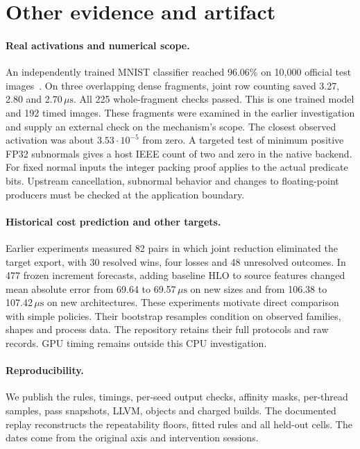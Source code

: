 \documentclass[sigplan,10pt,review,anonymous,nonacm]{acmart}
\newcommand{\us}{\ensuremath{\,\mu\mathrm{s}}}
\begin{document}
\appendix
\section{Other evidence and artifact}
\paragraph{Real activations and numerical scope.}
An independently trained MNIST classifier reached 96.06\% on 10,000 official test images~\cite{mnistkeras}. On three overlapping dense fragments, joint row counting saved 3.27, 2.80 and 2.70\us{}. All 225 whole-fragment checks passed. This is one trained model and 192 timed images. These fragments were examined in the earlier investigation and supply an external check on the mechanism's scope. The closest observed activation was about $3.53\cdot10^{-5}$ from zero. A targeted test of minimum positive FP32 subnormals gives a host IEEE count of two and zero in the native backend. For fixed normal inputs the integer packing proof applies to the actual predicate bits. Upstream cancellation, subnormal behavior and changes to floating-point producers must be checked at the application boundary.

\paragraph{Historical cost prediction and other targets.}
Earlier experiments measured 82 pairs in which joint reduction eliminated the target export, with 30 resolved wins, four losses and 48 unresolved outcomes. In 477 frozen increment forecasts, adding baseline HLO to source features changed mean absolute error from 69.64 to 69.57\us{} on new sizes and from 106.38 to 107.42\us{} on new architectures. These experiments motivate direct comparison with simple policies. Their bootstrap resamples condition on observed families, shapes and process data. The repository retains their full protocols and raw records. GPU timing remains outside this CPU investigation.

\paragraph{Reproducibility.}
We publish the rules, timings, per-seed output checks, affinity masks, per-thread samples, pass snapshots, LLVM, objects and charged builds. The documented replay reconstructs the repeatability floors, fitted rules and all held-out cells. The dates come from the original axis and intervention sessions.


\end{document}
